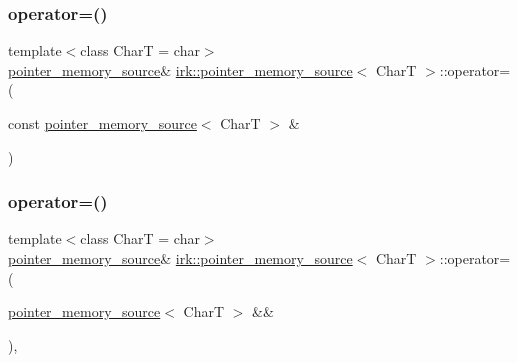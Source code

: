 \mbox{\label{classirk_1_1pointer__memory__source_a1eb99c944e47711d04d7472723c6132d}} 
\subsubsection{\texorpdfstring{operator=()}{operator=()}\hspace{0.1cm}{\footnotesize\ttfamily [1/2]}}
{\footnotesize\ttfamily template$<$class CharT  = char$>$ \\
\mbox{\hyperlink{classirk_1_1pointer__memory__source}{pointer\+\_\+memory\+\_\+source}}\& \mbox{\hyperlink{classirk_1_1pointer__memory__source}{irk\+::pointer\+\_\+memory\+\_\+source}}$<$ CharT $>$\+::operator= (\begin{DoxyParamCaption}\item[{const \mbox{\hyperlink{classirk_1_1pointer__memory__source}{pointer\+\_\+memory\+\_\+source}}$<$ CharT $>$ \&}]{ }\end{DoxyParamCaption})\hspace{0.3cm}{\ttfamily [default]}}

\mbox{\label{classirk_1_1pointer__memory__source_a5d982b5fbaefd34ffbf5644ccb8d55d0}} 
\subsubsection{\texorpdfstring{operator=()}{operator=()}\hspace{0.1cm}{\footnotesize\ttfamily [2/2]}}
{\footnotesize\ttfamily template$<$class CharT  = char$>$ \\
\mbox{\hyperlink{classirk_1_1pointer__memory__source}{pointer\+\_\+memory\+\_\+source}}\& \mbox{\hyperlink{classirk_1_1pointer__memory__source}{irk\+::pointer\+\_\+memory\+\_\+source}}$<$ CharT $>$\+::operator= (\begin{DoxyParamCaption}\item[{\mbox{\hyperlink{classirk_1_1pointer__memory__source}{pointer\+\_\+memory\+\_\+source}}$<$ CharT $>$ \&\&}]{ }\end{DoxyParamCaption})\hspace{0.3cm}{\ttfamily [default]}, {\ttfamily [noexcept]}}


